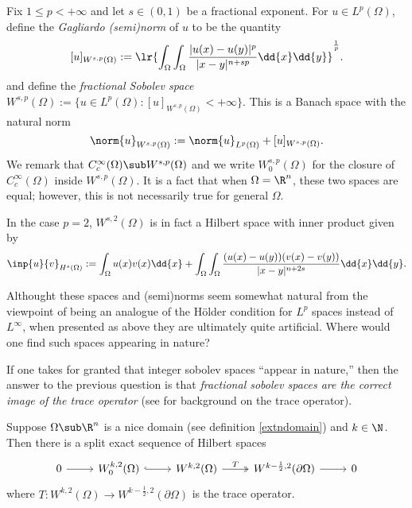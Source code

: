 \documentclass[../main.tex]{subfiles}
\begin{document}
\begin{definition}\label{fracnorms}
    Fix $ 1\leq p <+\infty $ and let $ s\in (0,1) $ be a fractional exponent. For $ u\in L^{p}(\Omega) $, define the \textit{Gagliardo (semi)norm} of $ u $ to be the quantity
    \[
        [u]_{W^{s,p}(\Omega)} := \lr{\int_{\Omega}\int_{\Omega} \frac{|u(x)-u(y)|^{p}}{|x-y|^{n+sp}}\dd{x}\dd{y}}^{\frac{1}{p}}.
    \]
    and define the \textit{fractional Sobolev space} $ W^{s,p}(\Omega):= \{u\in L^{p}(\Omega):[u]_{W^{s,p}(\Omega)}<+\infty\} $. This is a Banach space with the natural norm
    \[
        \norm{u}_{W^{s,p}(\Omega)} := \norm{u}_{L^{p}(\Omega)}+[u]_{W^{s,p}(\Omega)}.
    \]
    We remark that $ C^{\infty}_{c}(\Omega)\sub W^{s,p}(\Omega) $ and we write $ W_{0}^{s,p}(\Omega) $ for the closure of $ C^{\infty}_{c}(\Omega) $ inside $ W^{s,p}(\Omega) $. It is a fact that when $ \Omega = \R^{n} $, these two spaces are equal; however, this is not necessarily true for general $ \Omega $.

    In the case $ p=2 $, $ W^{s,2}(\Omega) $ is in fact a Hilbert space with inner product given by 
    \[
        \inp{u}{v}_{H^{s}(\Omega)} := \int_{\Omega} u(x)v(x)\dd{x} + \int_{\Omega}\int_{\Omega} \frac{(u(x)-u(y))(v(x)-v(y))}{|x-y|^{n+2s}} \dd{x}\dd{y}.
    \]

\end{definition}




Althought these spaces and (semi)norms seem somewhat natural from the viewpoint of being an analogue of the H\"{o}lder condition for $ L^{p} $ spaces instead of $ L^{\infty} $, when presented as above they are ultimately quite artificial. Where would one find such spaces appearing in nature?

If one takes for granted that integer sobolev spaces ``appear in nature,'' then the answer to the previous question is that \textit{fractional sobolev spaces are the correct image of the trace operator} (see \cite[Chapter 5]{evans:pde} for background on the trace operator).


\begin{proposition}
    Suppose $ \Omega\sub \R^{n} $ is a nice domain (see definition \ref{extndomain}) and $ k\in \N $. Then there is a split exact sequence of Hilbert spaces
\[\begin{tikzcd}
    0 & {W_0^{k,2}(\Omega)} & {W^{k,2}(\Omega)} & {W^{k-\frac{1}{2},2}(\partial\Omega)} & 0
	\arrow[from=1-1, to=1-2]
	\arrow[hook, from=1-2, to=1-3]
	\arrow["T", two heads, from=1-3, to=1-4]
	\arrow[from=1-4, to=1-5]
\end{tikzcd}\]
    where $ T: W^{k,2}(\Omega) \to W^{k-\frac{1}{2},2}(\partial\Omega)$ is the trace operator.
    
\end{proposition}
\end{document}
